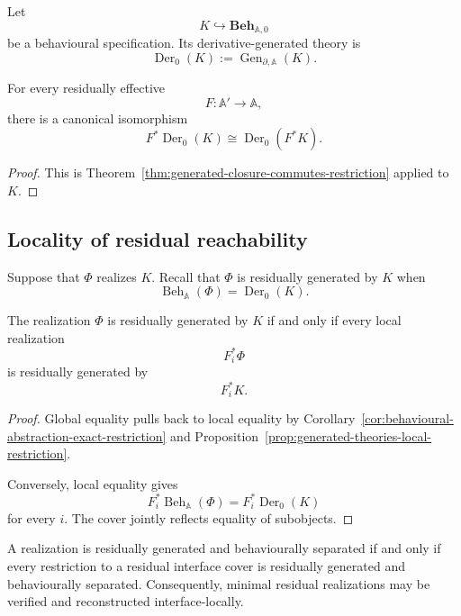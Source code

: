 Let
\[
    K
    \hookrightarrow
    \mathbf{Beh}_{\mathbb A,0}
\]
be a behavioural specification. Its derivative-generated theory is
\[
    \operatorname{Der}_0(K)
    :=
    \operatorname{Gen}_{\partial,\mathbb A}(K).
\]

\begin{proposition}
\label{prop:generated-theories-local-restriction}
For every residually effective
\[
    F:\mathbb A'\to\mathbb A,
\]
there is a canonical isomorphism
\[
    F^\ast
    \operatorname{Der}_0(K)
    \cong
    \operatorname{Der}_0
    (F^\ast K).
\]
\end{proposition}

\begin{proof}
This is
Theorem~\ref{thm:generated-closure-commutes-restriction}
applied to \(K\).
\end{proof}

\subsection{Locality of residual reachability}
\label{subsec:locality-reachability}

Suppose that \(\Phi\) realizes \(K\). Recall that \(\Phi\) is residually
generated by \(K\) when
\[
    \operatorname{Beh}_{\mathbb A}(\Phi)
    =
    \operatorname{Der}_0(K).
\]

\begin{theorem}
\label{thm:reachability-interface-local}
The realization \(\Phi\) is residually generated by \(K\) if and only if
every local realization
\[
    F_i^\ast\Phi
\]
is residually generated by
\[
    F_i^\ast K.
\]
\end{theorem}

\begin{proof}
Global equality pulls back to local equality by
Corollary~\ref{cor:behavioural-abstraction-exact-restriction}
and
Proposition~\ref{prop:generated-theories-local-restriction}.

Conversely, local equality gives
\[
    F_i^\ast
    \operatorname{Beh}_{\mathbb A}(\Phi)
    =
    F_i^\ast
    \operatorname{Der}_0(K)
\]
for every \(i\). The cover jointly reflects equality of subobjects.
\end{proof}

\begin{corollary}
\label{cor:local-myhill-nerode-principle}
A realization is residually generated and behaviourally separated if and only
if every restriction to a residual interface cover is residually generated
and behaviourally separated. Consequently, minimal residual realizations may
be verified and reconstructed interface-locally.
\end{corollary}

